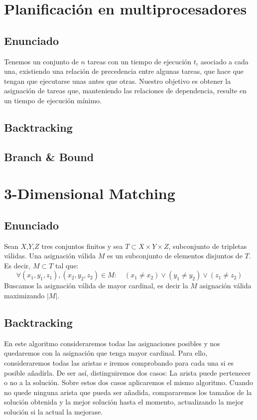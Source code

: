 \documentclass[a4paper, 11pt]{article} %
\begin{document}
\section{Planificación en multiprocesadores}
  \subsection{Enunciado}
  Tenemos un conjunto de $n$ tareas con un tiempo de ejecución $t_i$ asociado a cada una, existiendo una relación de precedencia
  entre algunas tareas, que hace que tengan que ejecutarse unas antes que otras. Nuestro objetivo es obtener la asignación de tareas que, manteniendo las relaciones de dependencia, resulte en un tiempo de ejecución mínimo. 
  
  
  \subsection{Backtracking}
  
  \subsection{Branch \& Bound}

\section{3-Dimensional Matching}
  \subsection{Enunciado}
    Sean $X$,$Y$,$Z$ tres conjuntos finitos y sea $T \subset X \times Y \times Z$, subconjunto de tripletas válidas.
    Una asignación válida $M$ es un subconjunto de elementos disjuntos de $T$. Es decir, $M \subset T$ tal que:
    \begin{equation}
     \forall (x_1,y_1,z_1), (x_2,y_2,z_2) \in M : \quad (x_1 \neq x_2) \vee (y_1 \neq y_2) \vee (z_1 \neq z_2)
    \end{equation} 
    Buscamos la asignación válida de mayor cardinal, es decir la $M$ asignación válida maximizando $|M|$.
    
  \subsection{Backtracking}
  En este algoritmo consideraremos todas las asignaciones posibles y nos quedaremos con la asignación que tenga mayor cardinal. Para ello, consideraremos todas las aristas e iremos comprobando para cada una si es posible añadirla. De ser así, distinguiremos dos casos: La arista puede pertenecer o no a la solución. Sobre estos dos casos aplicaremos el mismo algoritmo. Cuando no quede ninguna arista que pueda ser añadida, compararemos los tamaños de la solución obtenida y la mejor solución hasta el momento, actualizando la mejor solución si la actual la mejorase. 
  
\end{document}
